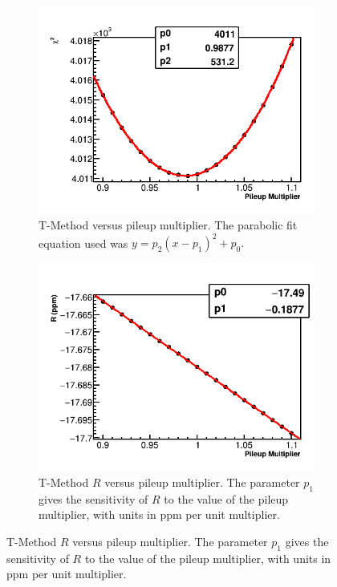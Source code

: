 \begin{figure}[h]
\centering
    \begin{subfigure}[t]{0.45\textwidth}
        \centering
        \includegraphics[width=\textwidth]{TMethod_Chi2_Vs_PileupMultiplier_Canv}
        \caption{T-Method \chisq versus pileup multiplier. The parabolic fit equation used was $y = p_{2}(x - p_{1})^{2} + p_{0}.$}
    \end{subfigure}%
    \hspace{1cm}
    \begin{subfigure}[t]{0.45\textwidth}
        \centering
        \includegraphics[width=\textwidth]{TMethod_R_Vs_PileupMultiplier_Canv}
        \caption{T-Method $R$ versus pileup multiplier. The parameter $p_{1}$ gives the sensitivity of $R$ to the value of the pileup multiplier, with units in ppm per unit multiplier.}
    \end{subfigure}


\end{figure}
